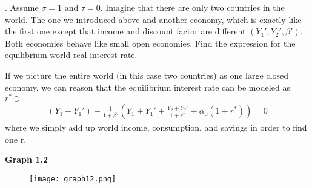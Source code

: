 \documentclass[11pt]{SelfArxOneColBMN}
\begin{document}
. Assume $\sigma = 1$ and $\tau = 0$. Imagine that there are only two countries in the world. The one we introduced above and another economy, which is exactly like the first one except that income and discount factor are different $(Y_1',Y_2',\beta')$. Both economies behave like small open economies. Find the expression for the equilibrium world real interest rate.
\begin{solution}
If we picture the entire world (in this case two countries) as one large closed economy, we can reason that the equilibrium interest rate can be modeled as $r^* \ni$
\begin{eqnarray*}
  (Y_1 +Y_1') - \frac{1}{1 + \beta'}(Y_1 + Y_1' + \frac{Y_2 + Y_2'}{1 + r^*} + \alpha_0(1 + r^*)) = 0
\end{eqnarray*}
where we simply add up world income, consumption, and savings in order to find one r. 
\end{solution}



\newpage
\clearpage
\noindent \textbf{Graph 1.2}
\begin{figure}[h]
  \texttt{[image: graph12.png]}
\end{figure}
\end{document}
